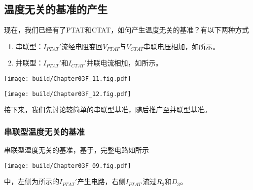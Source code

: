 \subsection{温度无关的基准的产生}
现在，我们已经有了PTAT和CTAT，如何产生温度无关的基准？有以下两种方式
\begin{enumerate}
    \item 串联型：$I_{PTAT}'$流经电阻变回$V_{PTAT}$与$V_{CTAT}$串联电压相加，如所示。
    \item 并联型：$I_{PTAT}'$和$I_{CTAT}'$并联电流相加，如所示。
\end{enumerate}
\begin{Figure}[温度无关的基准的两种构成方式]
    \begin{FigureSub}[串联型]
        \texttt{[image: build/Chapter03F\_11.fig.pdf]}
    \end{FigureSub}
    \qquad
    \begin{FigureSub}[并联型]
        \texttt{[image: build/Chapter03F\_12.fig.pdf]}
    \end{FigureSub}
\end{Figure}
接下来，我们先讨论较简单的串联型基准，随后推广至并联型基准。

\subsubsection{串联型温度无关的基准}
串联型温度无关的基准，基于，完整电路如所示
\begin{Figure}[串联型温度无关的基准]
    \texttt{[image: build/Chapter03F\_09.fig.pdf]}
\end{Figure}
中，左侧为所示的$I_{PTAT}'$产生电路，右侧$I_{PTAT'}$流过$R_2$和$D_3$。


